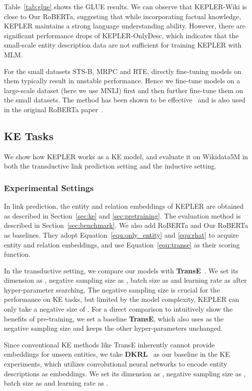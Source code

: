Table~\ref{tab:glue} shows the GLUE results. We can observe that KEPLER-Wiki is close to Our RoBERTa, suggesting that while incorporating factual knowledge, KEPLER maintains a strong language understanding ability. However, there are significant performance drops of KEPLER-OnlyDesc, which indicates that the small-scale entity description data are not sufficient for training KEPLER with MLM.

For the small datasets STS-B, MRPC and RTE, directly fine-tuning models on them typically result in unstable performance. Hence we fine-tune models on a large-scale dataset (here we use MNLI) first and then further fine-tune them on the small datasets.
The method has been shown to be effective~\citep{wang-etal-2019-tell} and is also used in the original RoBERTa paper~\citep{liu2019roberta}.


\subsection{KE Tasks}
\label{sec:KEexp}
We show how KEPLER works as a KE model, and evaluate it on Wikidata5M in both the transductive link prediction setting and the inductive setting.

\subsubsection*{Experimental Settings}
In link prediction, the entity and relation embeddings of KEPLER are obtained as described in Section~\ref{sec:ke} and \ref{sec:pretraining}. The evaluation method is described in Section~\ref{sec:benchmark}.  We also add RoBERTa and Our RoBERTa as baselines. They adopt Equation~\ref{equ:only_entity} and \ref{equ:rhat} to acquire entity and relation embeddings, and use Equation~\ref{equ:transe} as their scoring function.

In the transductive setting, we compare our models with \textbf{TransE}~\citep{bordes2013translating}. We set its dimension as , negative sampling size as , batch size as  and learning rate as  after hyper-parameter searching.  The negative sampling size is crucial for the performance on KE tasks, but limited by the model complexity, KEPLER can only take a negative size of . For a direct comparison to intuitively show the benefits of pre-training, we set a baseline \textbf{TransE}, which also uses  as the negative sampling size and keeps the other hyper-parameters unchanged.
    
Since conventional KE methods like TransE inherently cannot provide embeddings for unseen entities, we take \textbf{DKRL}~\citep{Xie:2016:RLK:3016100.3016273} as our baseline in the KE experiments, which utilizes convolutional neural networks to encode entity descriptions as embeddings. We set its dimension as , negative sampling size as , batch size as  and learning rate as . 


